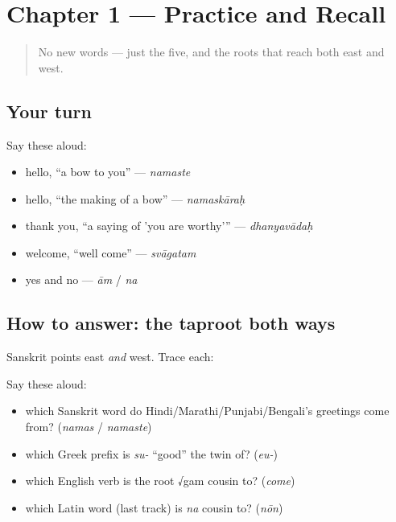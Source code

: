 \section[Practice]{Chapter 1 — Practice and Recall}

\label{lesson:SA-C01-practice}



\begin{quote}
No new words — just the five, and the roots that reach both east and west.
\end{quote}

\subsection*{Your turn}
Say these aloud:

\begin{itemize}
\raggedright
  \item hello, \textquotedblleft{}a bow to you\textquotedblright{} — \emph{namaste}
  \item hello, \textquotedblleft{}the making of a bow\textquotedblright{} — \emph{namaskāraḥ}
  \item thank you, \textquotedblleft{}a saying of 'you are worthy'\textquotedblright{} — \emph{dhanyavādaḥ}
  \item welcome, \textquotedblleft{}well come\textquotedblright{} — \emph{svāgatam}
  \item yes and no — \emph{ām} / \emph{na}
\end{itemize}

\subsection*{How to answer: the taproot both ways}
Sanskrit points east \emph{and} west. Trace each:

Say these aloud:

\begin{itemize}
\raggedright
  \item which Sanskrit word do Hindi/Marathi/Punjabi/Bengali's greetings come from? (\emph{namas} / \emph{namaste})
  \item which Greek prefix is \emph{su-} \textquotedblleft{}good\textquotedblright{} the twin of? (\emph{eu-})
  \item which English verb is the root √gam cousin to? (\emph{come})
  \item which Latin word (last track) is \emph{na} cousin to? (\emph{nōn})
\end{itemize}

